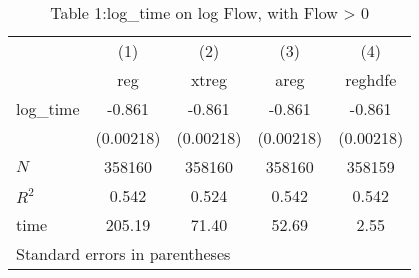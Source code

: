 \begin{table}[htbp]\centering
\caption{Table 1:log\_time on log Flow, with Flow > 0}
\begin{tabular}{l*{4}{c}}
\hline\hline
            &\multicolumn{1}{c}{(1)}&\multicolumn{1}{c}{(2)}&\multicolumn{1}{c}{(3)}&\multicolumn{1}{c}{(4)}\\
            &\multicolumn{1}{c}{reg}&\multicolumn{1}{c}{xtreg}&\multicolumn{1}{c}{areg}&\multicolumn{1}{c}{reghdfe}\\
\hline
log\_time    &      -0.861&      -0.861&      -0.861&      -0.861\\
            &   (0.00218)&   (0.00218)&   (0.00218)&   (0.00218)\\
\hline
\(N\)       &      358160&      358160&      358160&      358159\\
\(R^{2}\)   &       0.542&       0.524&       0.542&       0.542\\
time        &      205.19&       71.40&       52.69&        2.55\\
\hline\hline
\multicolumn{5}{l}{\footnotesize Standard errors in parentheses}\\
\end{tabular}
\end{table}
